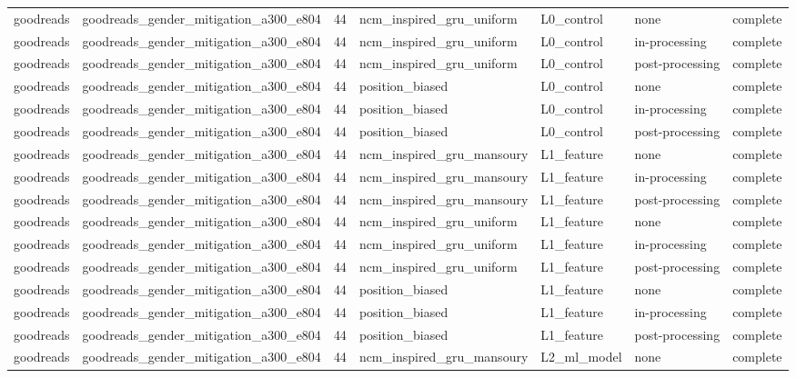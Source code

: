 \begin{table}[htbp!]
\begin{tabular}{llrllll}
goodreads & goodreads\_gender\_mitigation\_a300\_e804 & 44 & ncm\_inspired\_gru\_uniform & L0\_control & none & complete \\
goodreads & goodreads\_gender\_mitigation\_a300\_e804 & 44 & ncm\_inspired\_gru\_uniform & L0\_control & in-processing & complete \\
goodreads & goodreads\_gender\_mitigation\_a300\_e804 & 44 & ncm\_inspired\_gru\_uniform & L0\_control & post-processing & complete \\
goodreads & goodreads\_gender\_mitigation\_a300\_e804 & 44 & position\_biased & L0\_control & none & complete \\
goodreads & goodreads\_gender\_mitigation\_a300\_e804 & 44 & position\_biased & L0\_control & in-processing & complete \\
goodreads & goodreads\_gender\_mitigation\_a300\_e804 & 44 & position\_biased & L0\_control & post-processing & complete \\
goodreads & goodreads\_gender\_mitigation\_a300\_e804 & 44 & ncm\_inspired\_gru\_mansoury & L1\_feature & none & complete \\
goodreads & goodreads\_gender\_mitigation\_a300\_e804 & 44 & ncm\_inspired\_gru\_mansoury & L1\_feature & in-processing & complete \\
goodreads & goodreads\_gender\_mitigation\_a300\_e804 & 44 & ncm\_inspired\_gru\_mansoury & L1\_feature & post-processing & complete \\
goodreads & goodreads\_gender\_mitigation\_a300\_e804 & 44 & ncm\_inspired\_gru\_uniform & L1\_feature & none & complete \\
goodreads & goodreads\_gender\_mitigation\_a300\_e804 & 44 & ncm\_inspired\_gru\_uniform & L1\_feature & in-processing & complete \\
goodreads & goodreads\_gender\_mitigation\_a300\_e804 & 44 & ncm\_inspired\_gru\_uniform & L1\_feature & post-processing & complete \\
goodreads & goodreads\_gender\_mitigation\_a300\_e804 & 44 & position\_biased & L1\_feature & none & complete \\
goodreads & goodreads\_gender\_mitigation\_a300\_e804 & 44 & position\_biased & L1\_feature & in-processing & complete \\
goodreads & goodreads\_gender\_mitigation\_a300\_e804 & 44 & position\_biased & L1\_feature & post-processing & complete \\
goodreads & goodreads\_gender\_mitigation\_a300\_e804 & 44 & ncm\_inspired\_gru\_mansoury & L2\_ml\_model & none & complete \\

\end{tabular}
\end{table}
